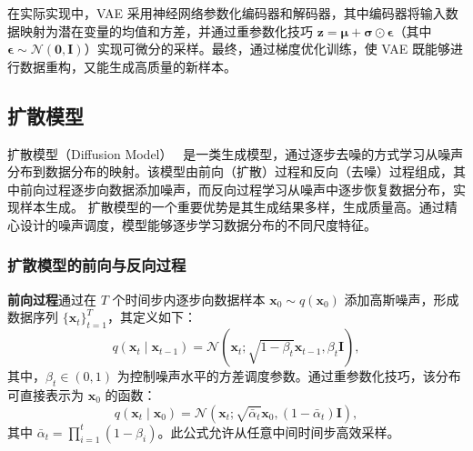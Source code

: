 在实际实现中，VAE 采用神经网络参数化编码器和解码器，其中编码器将输入数据映射为潜在变量的均值和方差，并通过重参数化技巧 $\mathbf{z} = \boldsymbol{\mu} + \boldsymbol{\sigma} \odot \boldsymbol{\epsilon}$（其中 $\boldsymbol{\epsilon} \sim \mathcal{N}(\mathbf{0}, \mathbf{I})$）实现可微分的采样。最终，通过梯度优化训练，使 VAE 既能够进行数据重构，又能生成高质量的新样本。


\subsection{扩散模型}
扩散模型（Diffusion Model）~\cite{ho2020ddpm} 是一类生成模型，通过逐步去噪的方式学习从噪声分布到数据分布的映射。该模型由前向（扩散）过程和反向（去噪）过程组成，其中前向过程逐步向数据添加噪声，而反向过程学习从噪声中逐步恢复数据分布，实现样本生成。
扩散模型的一个重要优势是其生成结果多样，生成质量高。通过精心设计的噪声调度，模型能够逐步学习数据分布的不同尺度特征。


\subsubsection{扩散模型的前向与反向过程}
\textbf{前向过程}通过在 $T$ 个时间步内逐步向数据样本 $\mathbf{x}_0 \sim q(\mathbf{x}_0)$ 添加高斯噪声，形成数据序列 $\{\mathbf{x}_t\}_{t=1}^{T}$，其定义如下：
\begin{equation}
    q(\mathbf{x}_t \mid \mathbf{x}_{t-1}) = \mathcal{N}(\mathbf{x}_t; \sqrt{1 - \beta_t} \mathbf{x}_{t-1}, \beta_t \mathbf{I}),
\end{equation}
其中，$\beta_t \in (0,1)$ 为控制噪声水平的方差调度参数。通过重参数化技巧，该分布可直接表示为 $\mathbf{x}_0$ 的函数：
\begin{equation}
    q(\mathbf{x}_t \mid \mathbf{x}_0) = \mathcal{N}(\mathbf{x}_t; \sqrt{\bar{\alpha}_t} \mathbf{x}_0, (1 - \bar{\alpha}_t) \mathbf{I}),
\end{equation}
其中 $\bar{\alpha}_t = \prod_{i=1}^{t} (1 - \beta_i)$。此公式允许从任意中间时间步高效采样。

